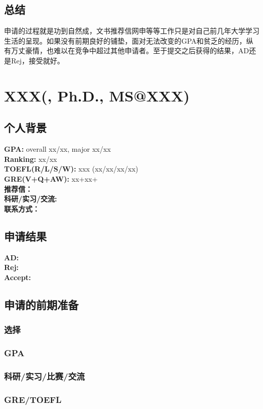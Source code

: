 \documentclass[a4paper,UTF8]{book}
\begin{document}
    \subsection*{总结}
        申请的过程就是功到自然成，文书推荐信网申等等工作只是对自己前几年大学学习生活的呈现。如果没有前期良好的铺垫，面对无法改变的GPA和贫乏的经历，纵有万丈豪情，也难以在竞争中超过其他申请者。至于提交之后获得的结果，AD还是Rej，接受就好。

\clearpage
\section{XXX(, Ph.D., MS@XXX)}
    \subsection*{个人背景}
        \textbf{GPA:} overall xx/xx, major xx/xx\\
        \textbf{Ranking:} xx/xx\\
        \textbf{TOEFL(R/L/S/W): }xxx (xx/xx/xx/xx)\\
        \textbf{GRE(V+Q+AW):} xx+xx+\\
        \textbf{推荐信：} \\
        \textbf{科研/实习/交流:} \\ 
        \textbf{联系方式：} 

    \subsection*{申请结果}
        \textbf{AD:} \\
        \textbf{Rej:} \\
        \textbf{Accept:} 

    \subsection*{申请的前期准备}
        \subsubsection*{选择}
        \subsubsection*{GPA}
        \subsubsection*{科研/实习/比赛/交流}
        \subsubsection*{GRE/TOEFL}
\end{document}
